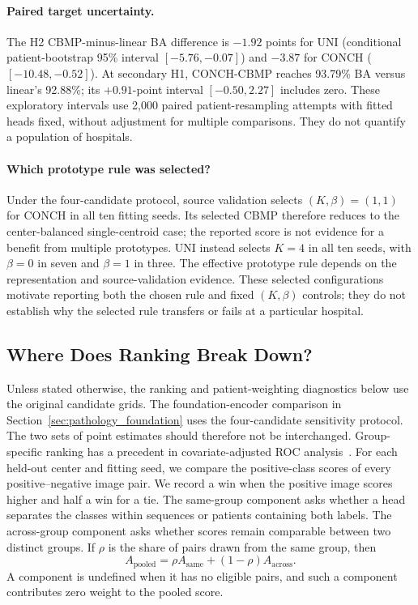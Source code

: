 \paragraph{Paired target uncertainty.}
The H2 CBMP-minus-linear BA difference is $-1.92$ points for UNI (conditional patient-bootstrap 95\% interval $[-5.76,-0.07]$) and $-3.87$ for CONCH ($[-10.48,-0.52]$). At secondary H1, CONCH-CBMP reaches 93.79\% BA versus linear's 92.88\%; its $+0.91$-point interval $[-0.50,2.27]$ includes zero. These exploratory intervals use 2,000 paired patient-resampling attempts with fitted heads fixed, without adjustment for multiple comparisons. They do not quantify a population of hospitals.

\paragraph{Which prototype rule was selected?}
Under the four-candidate protocol, source validation selects $(K,\beta)=(1,1)$ for CONCH in all ten fitting seeds. Its selected CBMP therefore reduces to the center-balanced single-centroid case; the reported score is not evidence for a benefit from multiple prototypes. UNI instead selects $K=4$ in all ten seeds, with $\beta=0$ in seven and $\beta=1$ in three. The effective prototype rule depends on the representation and source-validation evidence. These selected configurations motivate reporting both the chosen rule and fixed $(K,\beta)$ controls; they do not establish why the selected rule transfers or fails at a particular hospital.



\subsection{Where Does Ranking Break Down?}
\label{sec:group_ranking}
Unless stated otherwise, the ranking and patient-weighting diagnostics below use the original candidate grids. The foundation-encoder comparison in Section~\ref{sec:pathology_foundation} uses the four-candidate sensitivity protocol. The two sets of point estimates should therefore not be interchanged.
Group-specific ranking has a precedent in covariate-adjusted ROC analysis~\cite{janes2009adjusting}. For each held-out center and fitting seed, we compare the positive-class scores of every positive--negative image pair. We record a win when the positive image scores higher and half a win for a tie. The same-group component asks whether a head separates the classes within sequences or patients containing both labels. The across-group component asks whether scores remain comparable between two distinct groups. If $\rho$ is the share of pairs drawn from the same group, then
\begin{equation}
    A_{\mathrm{pooled}}=\rho A_{\mathrm{same}}+(1-\rho)A_{\mathrm{across}}.
    \label{eq:ranking_decomposition}
\end{equation}
A component is undefined when it has no eligible pairs, and such a component contributes zero weight to the pooled score.

